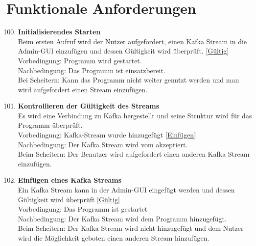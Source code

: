 \chapter{Funktionale Anforderungen}
\begin{enumerate}[label=\textbf{PF\arabic{enumi}0}]
	\setcounter{enumi}{99}
	\section{Pflicht Funktionale Anforderungen}
	\subsection{Server}

	\item \textbf{Initialisierendes Starten }\\
		Beim ersten Aufruf wird der Nutzer aufgefordert, einen Kafka Stream in die  Admin-GUI einzufügen und dessen Gültigkeit wird überprüft. \ref{Gültig}\\
		Vorbedingung: Programm wird gestartet.\\ 
		Nachbedingung: Das Programm ist einsatzbereit.\\ 
		Bei Scheitern: Kann das Programm nicht weiter genutzt werden und man wird aufgefordert einen Stream einzufügen.  
	
	\item \textbf{Kontrollieren der Gültigkeit des Streams} \label{Gültig}\\ 
		Es wird eine Verbindung zu Kafka hergestellt und seine Struktur wird für das Programm überprüft.\\ 
		Vorbedingung: Kafka-Stream wurde hinzugefügt \ref{Einfügen}\\ 
		Nachbedingung: Der Kafka Stream wird vom akzeptiert.\\ 
		Beim Scheitern: Der Benutzer wird aufgefordert einen anderen Kafka Stream einzufügen.
	
	\item \textbf{Einfügen eines Kafka Streams} \label{Einfügen}\\
		Ein Kafka Stream kann in der Admin-GUI eingefügt werden und dessen Gültigkeit wird überprüft \ref{Gültig}\\ 
		Vorbedingung: Das Programm ist gestartet\\ 
		Nachbedingung: Der Kafka Stream wird dem Programm hinzugefügt.\\ 
		Beim Scheitern: Der Kafka Stream wird nicht hinzugefügt und dem Nutzer wird die Möglichkeit geboten einen anderen Stream hinzufügen.
	

\end{enumerate}
